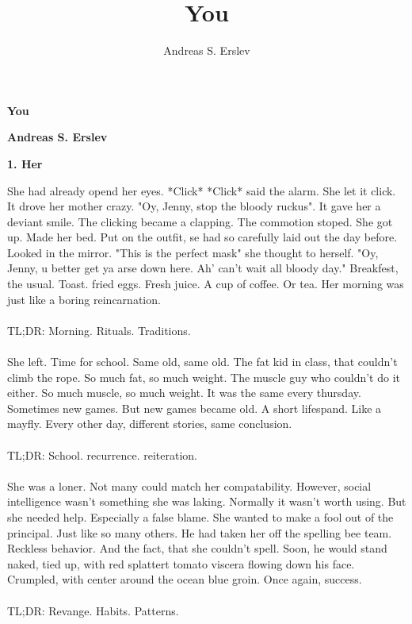 \documentclass[]{article}
\title{You}
\author{Andreas S. Erslev}
\begin{document}
\begin{center}
	\Large\textbf{You}
\end{center}
\begin{center}
	\large\textbf{Andreas S. Erslev}
\end{center}

\begin{center}
	\large\textbf{1. Her}
\end{center}

She had already opend her eyes. *Click* *Click* said the alarm. She let it click. It drove her mother crazy. "Oy, Jenny, stop the bloody ruckus". It gave her a deviant smile. The clicking became a clapping. The commotion stoped. She got up. Made her bed. Put on the outfit, se had so carefully laid out the day before. Looked in the mirror. "This is the perfect mask" she thought to herself. "Oy, Jenny, u better get ya arse down here. Ah' can't wait all bloody day." Breakfest, the usual. Toast. fried eggs. Fresh juice. A cup of coffee. Or tea. Her morning was just like a boring reincarnation.
\\ \\
TL;DR: Morning. Rituals. Traditions.
\\ \\
She left. Time for school. Same old, same old. The fat kid in class, that couldn't climb the rope. So much fat, so much weight. The muscle guy who couldn't do it either. So much muscle, so much weight. It was the same every thursday. Sometimes new games. But new games became old. A short lifespand. Like a mayfly. Every other day, different stories, same conclusion. 
\\ \\
TL;DR: School. recurrence. reiteration.
\\ \\
She was a loner. Not many could match her compatability. However, social intelligence wasn't something she was laking. Normally it wasn't worth using. But she needed help. Especially a false blame. She wanted to make a fool out of the principal. Just like so many others. He had taken her off the spelling bee team. Reckless behavior. And the fact, that she couldn't spell. Soon, he would stand naked, tied up, with red splattert tomato viscera flowing down his face. Crumpled, with center around the ocean blue groin. Once again, success.
\\ \\
TL;DR: Revange. Habits. Patterns.

\newpage
\end{document}
